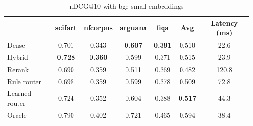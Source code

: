 \begin{table}[t]
\centering
\caption{nDCG@10 with bge-small embeddings}
\label{tab:ndcg_bge-small}
\begin{tabular}{lcccccc}
\toprule
 & scifact & nfcorpus & arguana & fiqa & Avg & Latency (ms) \\
\midrule
Dense & 0.701 & 0.343 & \textbf{0.607} & \textbf{0.391} & 0.510 & 22.6 \\
Hybrid & \textbf{0.728} & \textbf{0.360} & 0.599 & 0.371 & 0.515 & 23.9 \\
Rerank & 0.690 & 0.359 & 0.511 & 0.369 & 0.482 & 120.8 \\
\midrule
Rule router & 0.698 & 0.359 & 0.599 & 0.378 & 0.509 & 72.8 \\
Learned router & 0.724 & 0.352 & 0.604 & 0.388 & \textbf{0.517} & 44.3 \\
Oracle & 0.790 & 0.402 & 0.721 & 0.465 & 0.594 & 38.4 \\
\bottomrule
\end{tabular}
\end{table}